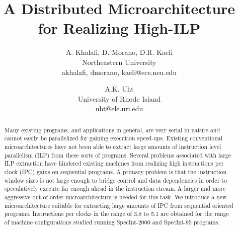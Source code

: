 \documentclass[10pt,twocolumn]{IEEEtran}
\begin{document}
%
\parskip 1mm
%
%
\title{A Distributed Microarchitecture for Realizing High-ILP}
%
\author{
A. {Khalafi}, D. Morano, D.R. Kaeli\\
Northeastern University\\
{{akhalafi}, dmorano, kaeli}@ece.neu.edu\\
\and
A.K. Uht\\
University of Rhode Island\\
uht@ele.uri.edu
}
%
%
%
%
\maketitle
%
%
%
\begin{abstract}
Many existing programs, and applications in general, are
very serial in nature and cannot easily be parallelized
for gaining execution speed-ups.
Existing conventional microarchitectures have not
been able to extract large amounts of instruction level parallelism (ILP)
from these sorts of programs.
Several problems associated with large ILP
extraction have hindered existing machines from realizing high
instructions per clock (IPC) 
gains on sequential programs.
A primary problem is that the instruction window sizes is not
large enough to bridge control and data dependencies in order
to speculatively execute far enough ahead in the instruction stream.
A larger and more aggressive out-of-order microarchitecture
is needed for this task.
We introduce a new microarchitecture suitable for extracting
large amounts of 
IPC from sequential oriented programs.
Instructions per clocks
in the range of 3.8 to 5.1 are obtained for the
range of machine configurations studied running SpecInt-2000 and
SpecInt-95 programs.
\end{abstract}
%
%
\end{document}
